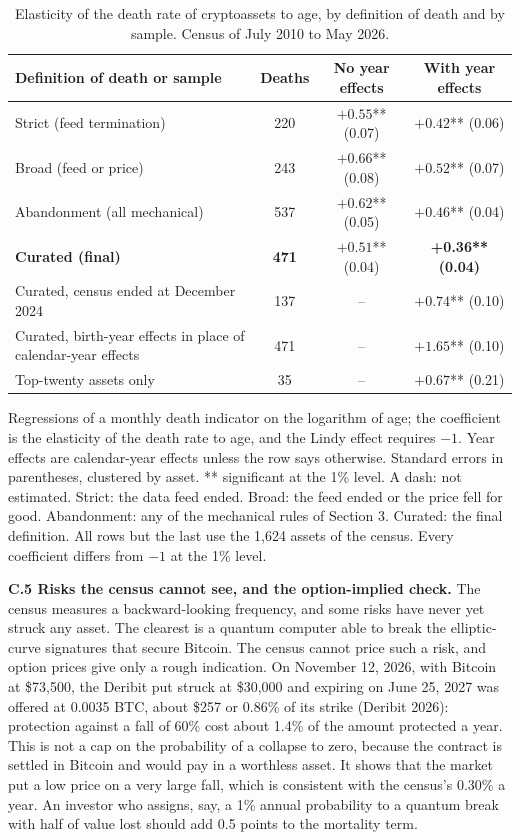 \documentclass[11pt]{article}
\begin{document}
\begin{table}[ht]\centering\small
\caption{Elasticity of the death rate of cryptoassets to age, by definition of death and by sample. Census of July 2010 to May 2026.}
\label{tab:lindy}
\begin{tabular}{lccc}
\toprule
Definition of death or sample & Deaths & No year effects & With year effects \\
\midrule
Strict (feed termination) & 220 & $+0.55$** (0.07) & $+0.42$** (0.06) \\
Broad (feed or price) & 243 & $+0.66$** (0.08) & $+0.52$** (0.07) \\
Abandonment (all mechanical) & 537 & $+0.62$** (0.05) & $+0.46$** (0.04) \\
\textbf{Curated (final)} & \textbf{471} & $+0.51$** (0.04) & \textbf{+0.36** (0.04)} \\
Curated, census ended at December 2024 & 137 & -- & $+0.74$** (0.10) \\
Curated, birth-year effects in place of calendar-year effects & 471 & -- & $+1.65$** (0.10) \\
Top-twenty assets only & 35 & -- & $+0.67$** (0.21) \\
\bottomrule
\end{tabular}
\par\smallskip\parbox{0.9\textwidth}{\footnotesize Regressions of a monthly death indicator on the logarithm of age; the coefficient is the elasticity of the death rate to age, and the Lindy effect requires $-1$. Year effects are calendar-year effects unless the row says otherwise. Standard errors in parentheses, clustered by asset. ** significant at the 1\% level. A dash: not estimated. Strict: the data feed ended. Broad: the feed ended or the price fell for good. Abandonment: any of the mechanical rules of Section 3. Curated: the final definition. All rows but the last use the 1,624 assets of the census. Every coefficient differs from $-1$ at the 1\% level.}
\end{table}

\textbf{C.5 Risks the census cannot see, and the option-implied check.} The census measures a backward-looking frequency, and some risks have never yet struck any asset. The clearest is a quantum computer able to break the elliptic-curve signatures that secure Bitcoin. The census cannot price such a risk, and option prices give only a rough indication. On November 12, 2026, with Bitcoin at \$73,500, the Deribit put struck at \$30,000 and expiring on June 25, 2027 was offered at 0.0035 BTC, about \$257 or 0.86\% of its strike (Deribit 2026): protection against a fall of 60\% cost about 1.4\% of the amount protected a year. This is not a cap on the probability of a collapse to zero, because the contract is settled in Bitcoin and would pay in a worthless asset. It shows that the market put a low price on a very large fall, which is consistent with the census's 0.30\% a year. An investor who assigns, say, a 1\% annual probability to a quantum break with half of value lost should add 0.5 points to the mortality term.
\end{document}
